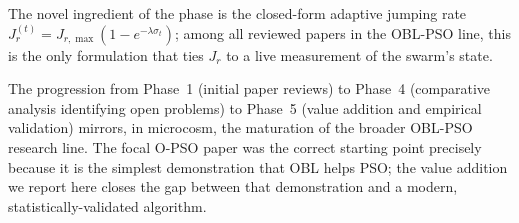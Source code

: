 \documentclass[11pt,a4paper]{article}
\newcommand{\jrt}{J_{r}^{(t)}}
\newcommand{\jrmax}{J_{r,\max}}
\begin{document}
The novel ingredient of the phase is the closed-form adaptive jumping
rate $\jrt = \jrmax(1 - e^{-\lambda \sigma_t})$; among all reviewed
papers in the OBL-PSO line, this is the only formulation that ties $J_r$
to a live measurement of the swarm's state.

The progression from Phase~1 (initial paper reviews) to Phase~4
(comparative analysis identifying open problems) to Phase~5 (value
addition and empirical validation) mirrors, in microcosm, the maturation
of the broader OBL-PSO research line. The focal O-PSO paper was the
correct starting point precisely because it is the simplest demonstration
that OBL helps PSO; the value addition we report here closes the gap
between that demonstration and a modern, statistically-validated
algorithm.


\end{document}
